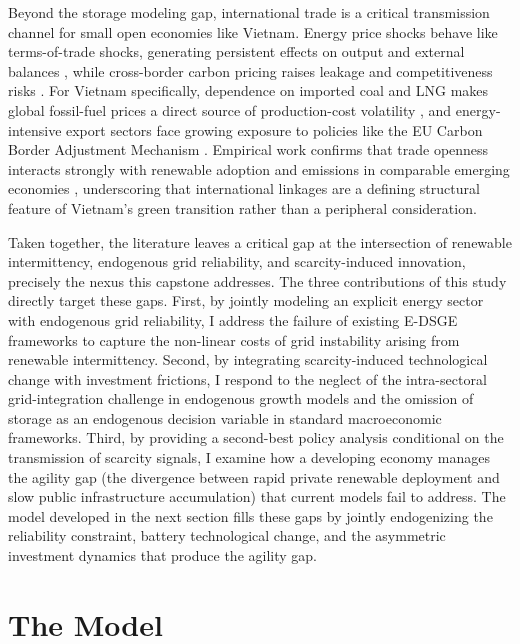 	Beyond the storage modeling gap, international trade is a critical transmission channel for small open economies like Vietnam. Energy price shocks behave like terms-of-trade shocks, generating persistent effects on output and external balances \citep{obstfeld1995, corsetti2010}, while cross-border carbon pricing raises leakage and competitiveness risks \citep{bohringer2018, balke2022}. For Vietnam specifically, dependence on imported coal and LNG makes global fossil-fuel prices a direct source of production-cost volatility \citep{iea2023, gso2024}, and energy-intensive export sectors face growing exposure to policies like the EU Carbon Border Adjustment Mechanism \citep{ec2023}. Empirical work confirms that trade openness interacts strongly with renewable adoption and emissions in comparable emerging economies \citep{almulali2015, vo2020}, underscoring that international linkages are a defining structural feature of Vietnam's green transition rather than a peripheral consideration.
	
	Taken together, the literature leaves a critical gap at the intersection of renewable intermittency, endogenous grid reliability, and scarcity-induced innovation, precisely the nexus this capstone addresses. The three contributions of this study directly target these gaps. First, by jointly
	modeling an explicit energy sector with endogenous grid reliability, I address the failure of existing E-DSGE frameworks to capture the non-linear costs of grid instability arising from renewable intermittency. Second, by integrating scarcity-induced technological change with investment frictions, I respond to the neglect of the intra-sectoral grid-integration challenge in endogenous growth models and the omission of storage as an endogenous decision variable in standard
	macroeconomic frameworks. Third, by providing a second-best policy analysis conditional on
	the transmission of scarcity signals, I examine how a developing economy manages the agility gap
	(the divergence between rapid private renewable deployment and slow public infrastructure accumulation) that current models fail to address. The model developed in the next section fills
	these gaps by jointly endogenizing the reliability constraint, battery technological change, and
	the asymmetric investment dynamics that produce the agility gap.
	
	
	\section{The Model} \label{sec:methodology}
	
